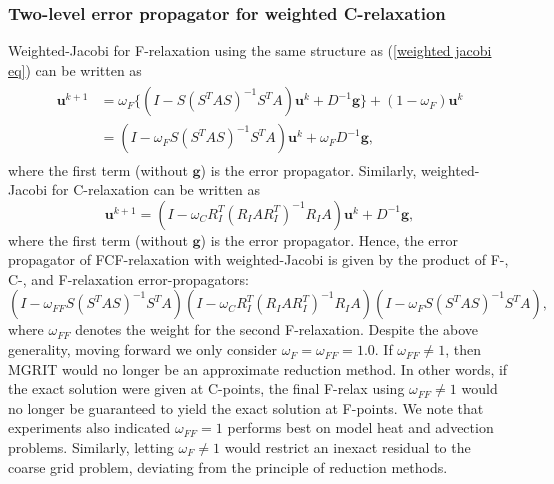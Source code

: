 \documentclass[VANCOUVER,STIX1COL]{WileyNJD-v2}
\begin{document}
\subsubsection{Two-level error propagator for weighted C-relaxation}

Weighted-Jacobi for F-relaxation using the same structure as (\ref{weighted jacobi eq}) can be written as
\begin{align}
\begin{split}
\mathbf{u}^{k+1} &= \omega_F \{(I-S(S^TAS)^{-1}S^TA)\mathbf{u}^k + D^{-1}\mathbf{g}\} + (1-\omega_F) \mathbf{u}^k \\
&= (I - \omega_F S(S^TAS)^{-1}S^TA)\mathbf{u}^k + \omega_F D^{-1}\mathbf{g},
\end{split}
\end{align}
where the first term (without $\mathbf{g}$) is the error propagator.  
Similarly, weighted-Jacobi for C-relaxation can be written as
\begin{equation} \label{C-realx}
\mathbf{u}^{k+1} = (I - \omega_C R^T_I(R_IAR^T_I)^{-1}R_IA) \mathbf{u}^k + D^{-1}\mathbf{g},
\end{equation}
where the first term (without $\mathbf{g}$) is the error propagator.
Hence, the error propagator of FCF-relaxation with weighted-Jacobi is given by
the product of F-, C-, and F-relaxation error-propagators:
\begin{equation}
   (I-\omega_{FF} S(S^TAS)^{-1}S^TA)(I-\omega_C R^T_I(R_IAR^T_I)^{-1}R_IA)(I-\omega_F S(S^TAS)^{-1}S^TA),
\end{equation}
where $\omega_{FF}$ denotes the weight for the second F-relaxation. Despite the
above generality, moving forward we only consider $\omega_F = \omega_{FF} = 1.0$.
If $\omega_{FF} \neq 1$, then MGRIT would no longer be an approximate reduction method.
In other words, if the exact solution were given at C-points, the final F-relax using
$\omega_{FF}\neq 1$ would no longer be guaranteed to yield the exact solution at F-points.
We note that experiments also indicated $\omega_{FF} = 1$ performs best on model heat and advection problems. 
Similarly, letting $\omega_F \neq 1$ would restrict an inexact residual to the coarse grid
problem, deviating from the principle of reduction methods. 
\end{document}
